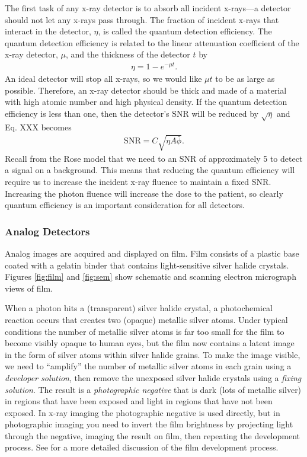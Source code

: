 \documentclass[mphy386-notes.tex]{subfiles}
\begin{document}
The first task of any x-ray detector is to absorb all incident x-rays---a
detector should not let any x-rays pass through. The fraction of incident x-rays
that interact in the detector, $\eta$, is called the quantum detection
efficiency. The quantum detection efficiency is related to the linear
attenuation coefficient of the x-ray detector, $\mu$, and the thickness of the detector $t$ by
\begin{align}
  \eta = 1 - e^{-\mu t}. 
\end{align}
An ideal detector will stop all x-rays, so we would like $\mu t$ to be as large
as possible. Therefore, an x-ray detector should be thick and made of a material
with high atomic number and high physical density. If the quantum detection
efficiency is less than one, then the detector's SNR will be reduced by
$\sqrt{\eta}$ and Eq. XXX becomes
\begin{align}
  \text{SNR} = C\sqrt{\eta A\bar{\phi}}.
\end{align}
Recall from the Rose model that we need to an SNR of approximately 5 to detect a
signal on a background. This means that reducing the quantum efficiency will
require us to increase the incident x-ray fluence to maintain a fixed SNR.
Increasing the photon fluence will increase the dose to the patient, so clearly
quantum efficiency is an important consideration for all detectors.

\subsubsection*{Analog Detectors}
Analog images are acquired and displayed on film. Film consists of a plastic
base coated with a gelatin binder that contains light-sensitive silver halide
crystals. Figures \ref{fig:film} and \ref{fig:sem} show schematic and scanning
electron micrograph views of film.

When a photon hits a (transparent) silver halide crystal, a photochemical
reaction occurs that creates two (opaque) metallic silver atoms. Under typical
conditions the number of metallic silver atoms is far too small for the film to
become visibly opaque to human eyes, but the film now contains a latent image in
the form of silver atoms within silver halide grains. To make the image visible,
we need to ``amplify'' the number of metallic silver atoms in each grain using a
\textit{developer solution}, then remove the unexposed silver halide crystals
using a \textit{fixing solution}. The result is a \textit{photographic negative}
that is dark (lots of metallic silver) in regions that have been exposed and
light in regions that have not been exposed. In x-ray imaging the photographic
negative is used directly, but in photographic imaging you need to invert the
film brightness by projecting light through the negative, imaging the result on
film, then repeating the development process. See \cite{barrett, stack} for a more
detailed discussion of the film development process.
\end{document}

